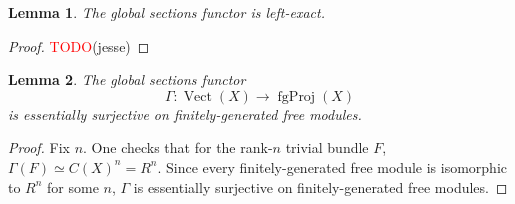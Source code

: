 \documentclass[11pt]{article}
\newcommand{\remph}[1]{\textcolor{red}{#1}}
\newcommand{\TODO}{\remph{TODO}}
\newcommand{\Vect}{\operatorname{Vect}}
\newcommand{\fgProj}{\operatorname{fgProj}}
\theoremstyle{plain}
\newtheorem{lemma}{Lemma}[section]
\theoremstyle{definition}
\begin{document}
\begin{lemma}\label{lemma:global-sections-left-exact}
  The global sections functor is left-exact.
\end{lemma}

\begin{proof}
  \TODO(jesse)
\end{proof}

\begin{lemma}\label{lemma:global-sections-essentially-surjective-aux}
  The global sections functor
    \[\Gamma : \Vect(X) \longrightarrow \fgProj(X)\]
  is essentially surjective on finitely-generated free modules.
\end{lemma}

\begin{proof}
  Fix \(n\). One checks that for the rank-\(n\) trivial bundle \(F\), \(\Gamma(F) \simeq C(X)^n = R^n\). Since every finitely-generated free module is isomorphic to \(R^n\) for some \(n\), \(\Gamma\) is essentially surjective on finitely-generated free modules.
\end{proof}
\end{document}
